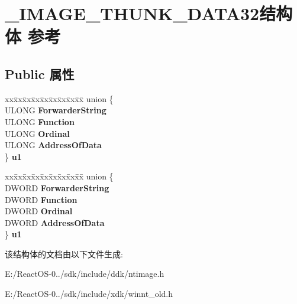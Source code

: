 \hypertarget{struct___i_m_a_g_e___t_h_u_n_k___d_a_t_a32}{}\section{\+\_\+\+I\+M\+A\+G\+E\+\_\+\+T\+H\+U\+N\+K\+\_\+\+D\+A\+T\+A32结构体 参考}
\label{struct___i_m_a_g_e___t_h_u_n_k___d_a_t_a32}
\subsection*{Public 属性}
\begin{DoxyCompactItemize}
\item 
\mbox{\label{struct___i_m_a_g_e___t_h_u_n_k___d_a_t_a32_a5748231f91880410ceea97495739fe0d}} 
\begin{tabbing}
xx\=xx\=xx\=xx\=xx\=xx\=xx\=xx\=xx\=\kill
union \{\\
\>ULONG {\bfseries ForwarderString}\\
\>ULONG {\bfseries Function}\\
\>ULONG {\bfseries Ordinal}\\
\>ULONG {\bfseries AddressOfData}\\
\} {\bfseries u1}\\

\end{tabbing}\item 
\mbox{\label{struct___i_m_a_g_e___t_h_u_n_k___d_a_t_a32_a4d011180648e1319a481b6d554af706c}} 
\begin{tabbing}
xx\=xx\=xx\=xx\=xx\=xx\=xx\=xx\=xx\=\kill
union \{\\
\>DWORD {\bfseries ForwarderString}\\
\>DWORD {\bfseries Function}\\
\>DWORD {\bfseries Ordinal}\\
\>DWORD {\bfseries AddressOfData}\\
\} {\bfseries u1}\\

\end{tabbing}\end{DoxyCompactItemize}


该结构体的文档由以下文件生成\+:\begin{DoxyCompactItemize}
\item 
E\+:/\+React\+O\+S-\/0../sdk/include/ddk/ntimage.\+h\item 
E\+:/\+React\+O\+S-\/0../sdk/include/xdk/winnt\+\_\+old.\+h\end{DoxyCompactItemize}
